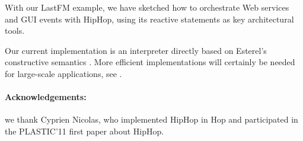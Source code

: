 \documentclass{llncs}
\begin{document}
With our LastFM example, we have sketched how to orchestrate Web
services and GUI events with HipHop, using its reactive statements as
key architectural tools.

Our current implementation is an interpreter directly
based on Esterel's constructive semantics
\cite{berry2000foundations}. More efficient implementations will
certainly be needed for large-scale applications, see \cite{CompilingEsterel}.
\medskip
\paragraph{\bf Acknowledgements:} we thank Cyprien Nicolas, 
who implemented HipHop in Hop and participated in the PLASTIC'11 first paper about HipHop.

\begin{small}
 

\end{small}
\end{document}
